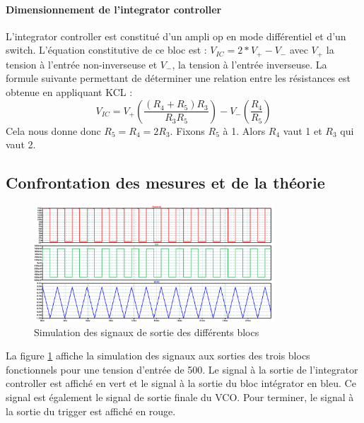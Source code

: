 \paragraph{Dimensionnement de l'integrator controller}
L'integrator controller est constitué d'un ampli op en mode différentiel et d'un switch. L'équation constitutive de ce bloc est : $V_{IC}=2*V_+ - V_-$ avec $V_+$ la tension à l'entrée non-inverseuse et $V_-$, la tension à l'entrée inverseuse. La formule suivante permettant de déterminer une relation entre les résistances est obtenue en appliquant KCL : $$V_{IC}=V_+ \left(\frac{\left(R_4 + R_5\right)R_3}{R_3R_5}\right)-V_-\left(\frac{R_4}{R_5}\right)$$ Cela nous donne donc $R_5 = R_4 = 2R_3$.
Fixons $R_5$ à \unit{1}{\kilo\ohm}. Alors $R_4$ vaut \unit{1}{\kilo\ohm} et $R_3$ qui vaut \unit{2}{\kilo\ohm}.

\subsection{Confrontation  des mesures et de la théorie}
\begin{figure}[ht]
	\centering
	\includegraphics[width=0.8\textwidth]{img/vco_response.png}
	\caption{Simulation des signaux de sortie des différents blocs}
	\label{fig:out_vco_th}
\end{figure}
La figure \ref{fig:out_vco_th} affiche la simulation des signaux aux sorties des trois blocs fonctionnels pour une tension d'entrée de \unit{500}{\milli\volt}. Le signal à la sortie de l'integrator controller est affiché en vert et le signal à la sortie du bloc intégrator en bleu. Ce signal est également le signal de sortie finale du VCO. Pour terminer, le signal à la sortie du trigger est affiché en rouge.

